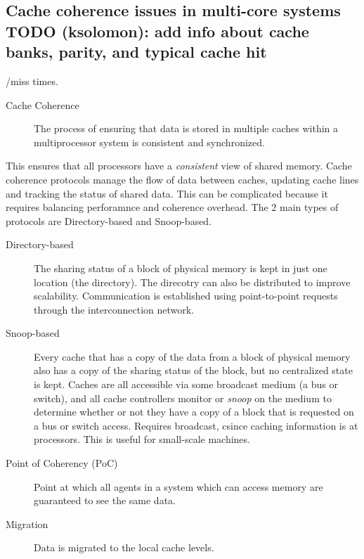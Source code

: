 \documentclass{article}
\begin{document}
    \subsection{ Cache coherence issues in multi-core systems TODO (ksolomon): add info about cache banks, parity, and typical cache hit}/miss times.
      \begin{description}
        \item[Cache Coherence]
          The process of ensuring that data is stored in multiple caches within a multiprocessor system is consistent and synchronized.
      \end{description}
      This ensures that all processors have a \textit{consistent} view of shared memory. Cache coherence protocols manage the flow of data between caches, updating cache lines and tracking the status of shared data. This can be complicated because it requires balancing perforamnce and coherence overhead. The 2 main types of protocols are Directory-based and Snoop-based.
      \begin{description}
        \item[Directory-based]
          The sharing status of a block of physical memory is kept in just one location (the directory). The direcotry can also be distributed to improve scalability. Communication is established using point-to-point requests through the interconnection network.
      \end{description}
      \begin{description}
        \item[Snoop-based]
          Every cache that has a copy of the data from a block of physical memory also has a copy of the sharing status of the block, but no centralized state is kept. Caches are all accessible via some broadcast medium (a bus or switch), and all cache controllers monitor or \textit{snoop} on the medium to determine whether or not they have a copy of a block that is requested on a bus or switch access. Requires broadcast, csince caching information is at processors. This is useful for small-scale machines.
      \end{description}
      \begin{description}
        \item[Point of Coherency (PoC)]
          Point at which all agents in a system which can access memory are guaranteed to see the same data.
      \end{description}
      \begin{description}
        \item[Migration]
          Data is migrated to the local cache levels.
      \end{description}
\end{document}
